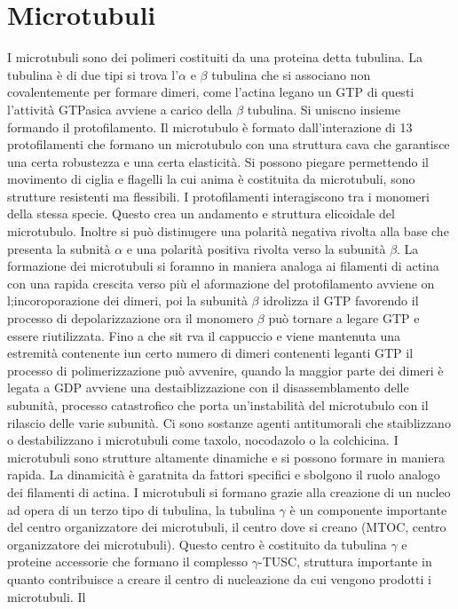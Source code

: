 \section{Microtubuli}
I microtubuli sono dei polimeri costituiti da una proteina detta tubulina. La tubulina \`e di due tipi si trova l'$\alpha$ e $\beta$ tubulina che si associano non covalentemente per 
formare dimeri, come l'actina legano un GTP di questi l'attivit\`a GTPasica avviene a carico della $\beta$ tubulina. Si uniscno insieme formando il protofilamento. Il microtubulo \`e 
formato dall'interazione di 13 protofilamenti che formano un microtubulo con una struttura cava che garantisce una certa robustezza e una certa elasticit\`a. Si possono piegare 
permettendo il movimento di ciglia e flagelli la cui anima \`e costituita da microtubuli, sono strutture resistenti ma flessibili. I protofilamenti interagiscono tra i monomeri della
stessa specie. Questo crea un andamento e struttura elicoidale del microtubulo. Inoltre si pu\`o distinugere una polarit\`a negativa rivolta alla base che presenta la subnit\`a $\alpha$
e una polarit\`a positiva rivolta verso la subunit\`a $\beta$. La formazione dei microtubuli si foramno in maniera analoga ai filamenti di actina con una rapida crescita verso pi\`u 
el aformazione del protofilamento avviene on l;incoroporazione dei dimeri, poi la subunit\`a $\beta$ idrolizza il GTP favorendo il processo di depolarizzazione ora il monomero $\beta$ 
pu\`o tornare a legare GTP e essere riutilizzata. Fino a che sit rva il cappuccio e viene mantenuta una estremit\`a contenente iun certo numero di dimeri contenenti leganti GTP il 
processo di polimerizzazione pu\`o avvenire, quando la maggior parte dei dimeri \`e legata a GDP avviene una destaiblizzazione con il disassemblamento delle subunit\`a, processo 
catastrofico che porta un'instabilit\`a del microtubulo con il rilascio delle varie subunit\`a. Ci sono sostanze agenti antitumorali che staiblizzano o destabilizzano i microtubuli come
taxolo, nocodazolo o la colchicina. I microtubuli sono strutture altamente dinamiche e si possono formare in maniera rapida. La dinamicit\`a \`e garatnita da fattori specifici e 
sbolgono il ruolo analogo dei filamenti di actina. I microtubuli si formano grazie alla creazione di un nucleo ad opera di un terzo tipo di tubulina, la tubulina $\gamma$ \`e un 
componente importante del centro organizzatore dei microtubuli, il centro dove si creano (MTOC, centro organizzatore dei microtubuli). Questo centro \`e costituito da tubulina $\gamma$ 
e proteine accessorie che formano il complesso $\gamma$-TUSC, struttura importante in quanto contribuisce a creare il centro di nucleazione da cui vengono prodotti i microtubuli. Il 
